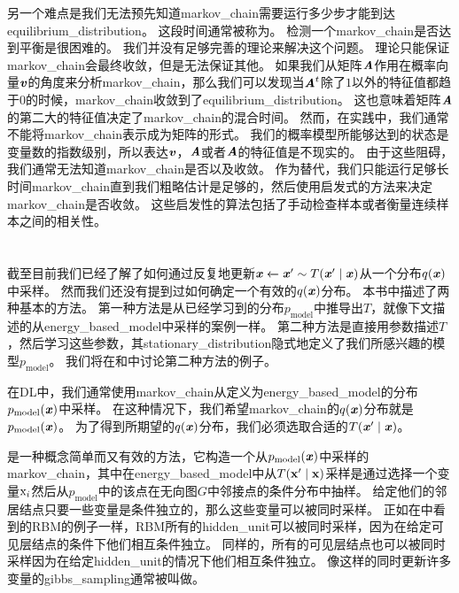 另一个难点是我们无法预先知道\gls{markov_chain}需要运行多少步才能到达\gls{equilibrium_distribution}。 
这段时间通常被称为。
检测一个\gls{markov_chain}是否达到平衡是很困难的。
我们并没有足够完善的理论来解决这个问题。
理论只能保证\gls{markov_chain}会最终收敛，但是无法保证其他。
如果我们从矩阵$\boldsymbol{\mathit{A}}$作用在概率向量$\boldsymbol{\mathit{v}}$的角度来分析\gls{markov_chain}，那么我们可以发现当$\boldsymbol{\mathit{A}}^t$除了$1$以外的特征值都趋于$0$的时候，\gls{markov_chain}收敛到了\gls{equilibrium_distribution}。
这也意味着矩阵$\boldsymbol{\mathit{A}}$的第二大的特征值决定了\gls{markov_chain}的混合时间。
然而，在实践中，我们通常不能将\gls{markov_chain}表示成为矩阵的形式。
我们的概率模型所能够达到的状态是变量数的指数级别，所以表达$\boldsymbol{\mathit{v}}$，$\boldsymbol{\mathit{A}}$或者$\boldsymbol{\mathit{A}}$的特征值是不现实的。
由于这些阻碍，我们通常无法知道\gls{markov_chain}是否以及收敛。
作为替代，我们只能运行足够长时间\gls{markov_chain}直到我们粗略估计是足够的，然后使用启发式的方法来决定\gls{markov_chain}是否收敛。
这些启发性的算法包括了手动检查样本或者衡量连续样本之间的相关性。



\section{}
\label{sec:gibbs_sampling}

截至目前我们已经了解了如何通过反复地更新$\boldsymbol{\mathit{x}} \xleftarrow{} \boldsymbol{\mathit{x}}'\sim T(\boldsymbol{\mathit{x}}'\mid\boldsymbol{\mathit{x}})$从一个分布$q(\boldsymbol{\mathit{x}})$中采样。
然而我们还没有提到过如何确定一个有效的$q(\boldsymbol{\mathit{x}})$分布。
本书中描述了两种基本的方法。
第一种方法是从已经学习到的分布$p_{\text{model}}$中推导出$T$，就像下文描述的从\gls{energy_based_model}中采样的案例一样。
第二种方法是直接用参数描述$T$，然后学习这些参数，其\gls{stationary_distribution}隐式地定义了我们所感兴趣的模型$p_{\text{model}}$。
我们将在和中讨论第二种方法的例子。


在\gls{DL}中，我们通常使用\gls{markov_chain}从定义为\gls{energy_based_model}的分布$p_{\text{model}}(\boldsymbol{\mathit{x}})$中采样。
在这种情况下，我们希望\gls{markov_chain}的$q(\boldsymbol{\mathit{x}})$分布就是$p_{\text{model}}(\boldsymbol{\mathit{x}})$。
为了得到所期望的$q(\boldsymbol{\mathit{x}})$分布，我们必须选取合适的$T(\boldsymbol{\mathit{x}}'\mid \boldsymbol{\mathit{x}})$。


是一种概念简单而又有效的方法，它构造一个从$p_{\text{model}}(\boldsymbol{\mathit{x}})$中采样的\gls{markov_chain}，其中在\gls{energy_based_model}中从$T(\mathbf{x}'\mid \mathbf{x})$采样是通过选择一个变量$\mathrm{x}_i$然后从$p_{\text{model}}$中的该点在无向图$G$中邻接点的条件分布中抽样。
给定他们的邻居结点只要一些变量是条件独立的，那么这些变量可以被同时采样。
正如在中看到的\gls{RBM}的例子一样，\gls{RBM}所有的\gls{hidden_unit}可以被同时采样，因为在给定可见层结点的条件下他们相互条件独立。
同样的，所有的可见层结点也可以被同时采样因为在给定\gls{hidden_unit}的情况下他们相互条件独立。
像这样的同时更新许多变量的\gls{gibbs_sampling}通常被叫做。

